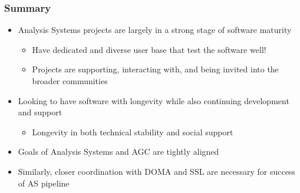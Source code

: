\begin{frame}
  \frametitle{Summary}

  \begin{itemize}\setlength{\itemsep}{0.2 cm}
    \item Analysis Systems projects are largely in a strong stage of software maturity
    \begin{itemize}
      \item Have dedicated and diverse user base that test the software well!
      \item Projects are supporting, interacting with, and being invited into the broader communities
    \end{itemize}
    \item Looking to have software with longevity while also continuing development and support
    \begin{itemize}
      \item Longevity in both technical stability and social support
    \end{itemize}
    \item Goals of Analysis Systems and AGC are tightly aligned
    \item Similarly, closer coordination with DOMA and SSL are necessary for success of AS pipeline
  \end{itemize}

\end{frame}
